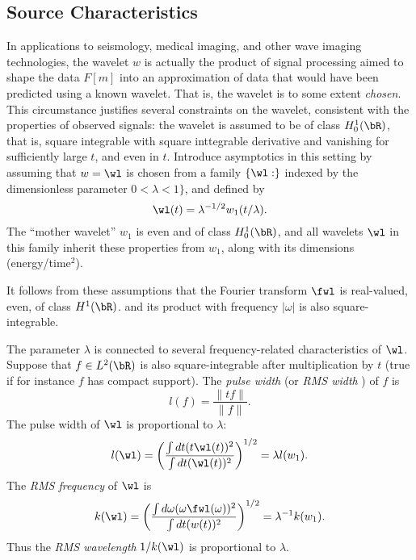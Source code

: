 \subsection{Source Characteristics}

In applications to seismology, medical imaging, and other wave imaging
technologies, the wavelet $w$ is actually the product of signal
processing aimed to shape the data $F[m]$ into an approximation of
data that would have been predicted using a known wavelet. That is, the wavelet is to some extent {\em
  chosen}. This circumstance justifies several constraints on the
wavelet, consistent with the properties of observed signals: the
wavelet is assumed to be of class $H^1_0(\bR)$, that is, square integrable with
square inttegrable derivative and vanishing for sufficiently large
$t$, and even in $t$.
Introduce asymptotics in this setting by assuming that $w = \wl$ is chosen
from a family $\{\wl:\}$ indexed by the dimensionless parameter
$0 <\lambda <1\}$, and defined by
\begin{equation}
  \label{eqn:wfam}
  \wl(t) = \lambda^{-1/2}w_1(t/\lambda).
\end{equation}
The  ``mother wavelet'' $w_1$ is even and of class $H^1_0(\bR)$, and
all wavelets $\wl$ in this family
inherit these properties from $w_1$, along with its dimensions (energy/time$^2$).

It follows from these assumptions that the Fourier transform $\fwl$ is
real-valued, even, of class $H^1(\bR)$. and its product with frequency $|\omega|$ is also
square-integrable.

The parameter $\lambda$ is connected to several frequency-related
characteristics of $\wl$. Suppose that $f \in L^2(\bR)$ is also square-integrable after
multiplication by $t$ (true if  for instance $f$ has compact
support). The {\em pulse width} (or {\em RMS width} ) of $f$ is
\begin{equation}
  \label{eqn:pw}
  l(f) = \frac{\|tf\|}{\|f\|}.
\end{equation}
The pulse width of $\wl$ is proportional to $\lambda$:
\begin{equation}
  \label{eqn:wpw}
  l(\wl) = \left(\frac{\int dt (t \wl(t))^2}{\int dt (\wl(t))^2}
  \right)^{1/2} = \lambda l(w_1).
\end{equation}
The {\em RMS frequency} of $\wl$ is
\begin{equation}
  \label{eqn:freq}
  k(\wl) = \left(\frac{\int d\omega (\omega \fwl(\omega))^2}{\int dt (w(t))^2} \right)^{1/2} = \lambda^{-1}k(w_1).
\end{equation}
Thus the {\em RMS wavelength} $1/k(\wl)$ is proportional to $\lambda$.

